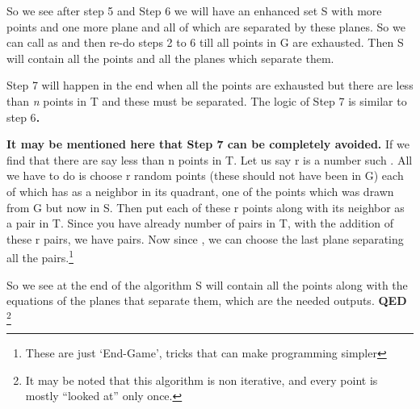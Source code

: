 \documentclass[english]{article}
\begin{document}
So we see after step 5 and Step 6 we will have an enhanced set S with
more points and one more plane and all of which are separated by these
 planes. So we can call  as  and then re-do steps
2 to 6 till all points  in G are exhausted. Then S will contain
all the points and all the planes which separate them.

Step 7 will happen in the end when all the points are exhausted but
there are less than\textit{ n }points in T and these must be separated.\textbf{
}The logic of Step 7 is similar to step 6\textbf{.}

\textbf{It may be mentioned here that Step 7 can be completely avoided.}
If we find that there are say less than n points in T. Let us say
r is a number such . All we have to do is choose r random
points (these should not have been in G) each of which has as a neighbor
in its quadrant, one of the points which was drawn from G but now
in S. Then put each of these r points along with its neighbor as a
pair in T. Since you have already  number of pairs in T,
with the addition of these r pairs, we have  pairs. Now since
, we can choose the last plane separating all the 
pairs.\footnote{These are just `End-Game', tricks that can make programming simpler}

So we see at the end of the algorithm S will contain all the points
along with the equations of the  planes that separate them,\textbf{
}which are the needed outputs. \textbf{QED} \footnote{It may be noted that this algorithm is non iterative, and every point
is mostly {}``looked at'' only once.}
\end{document}
